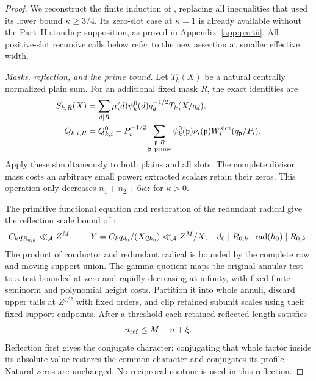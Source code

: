 \begin{proof}
We reconstruct the finite induction of , replacing all inequalities that used its lower bound $\kappa\ge3/4$. Its zero-slot case at $\kappa=1$ is already available without the Part~II standing supposition, as proved in Appendix~\ref{app:partii}. All positive-slot recursive calls below refer to the new assertion at smaller effective width.

\emph{Masks, reflection, and the prime bound.}
Let $T_k(X)$ be a natural centrally normalized plain sum. For an additional fixed mask $R$, the exact identities  are
\begin{align*}
 S_{k,R}(X)&=\sum_{d\mid R}\mu(d)\psi_k^0(d)q_d^{-1/2}T_k(X/q_d),\\
 Q_{k,i,R}&=Q_{k,i}^0-P_i^{-1/2}
       \sum_{\substack{\mathfrak p\mid R\\\mathfrak p\ {\rm prime}}}
       \psi_k^0(\mathfrak p)\nu_i(\mathfrak p)W_i^{\rm slot}(q_\mathfrak p/P_i).
\end{align*}
Apply these simultaneously to both plains and all slots. The complete divisor mass costs an arbitrary small power; extracted scalars retain their zeros. This operation only decreases $n_1+n_2+6\kappa z$ for $\kappa>0$.

The primitive functional equation and restoration of the redundant radical give the reflection scale bound of :
\[
 C_kq_{R_{0,k}}\ll_{\mathcal A} Z^M,\qquad
 Y=C_kq_{d_0}/(Xq_{h_0})\ll_{\mathcal A} Z^M/X,
 \quad d_0\mid R_{0,k},\ \operatorname{rad}(h_0)\mid R_{0,k}.
\]
The product of conductor and redundant radical is bounded by the complete row and moving-support union. The gamma quotient maps the original annular test to a test bounded at zero and rapidly decreasing at infinity, with fixed finite seminorm and polynomial height costs. Partition it into whole annuli, discard upper tails at $Z^{\xi/2}$ with fixed orders, and clip retained subunit scales using their fixed support endpoints. After a threshold each retained reflected length satisfies
\begin{equation}\label{eq:newreflection}
 n_{\rm ref}\le M-n+\xi.
\end{equation}
Reflection first gives the conjugate character; conjugating that whole factor inside its absolute value restores the common character and conjugates its profile. Natural zeros are unchanged. No reciprocal contour is used in this reflection.


\end{proof}
